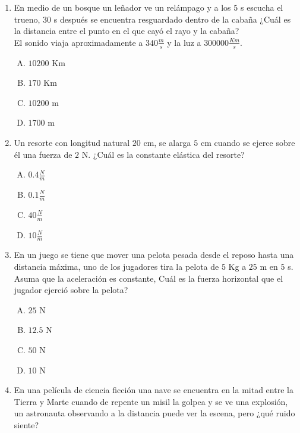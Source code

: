 \begin{enumerate}
\item En medio de un bosque un leñador ve un relámpago y a los $5$ s escucha el trueno, $30$ s después se encuentra resguardado dentro de la cabaña ¿Cuál es la distancia entre el punto en el que cayó el rayo y la cabaña?\label{dia-20}\\
El sonido viaja aproximadamente a $340\frac{m}{s}$ y la luz a $300000\frac{Km}{s}$. 

\begin{enumerate}[(A)]
\item $10200$ Km
\item $170$ Km
\item $10200$ m
\item $1700$ m
\end{enumerate}


\item Un resorte con longitud natural $20$ cm, se alarga $5$ cm cuando se ejerce sobre él una fuerza de $2$ N. ¿Cuál es la constante elástica del resorte? \label{dia-21}

\begin{enumerate}[(A)]
\item $0.4\frac{N}{m}$
\item $0.1\frac{N}{m}$
\item $40\frac{N}{m}$
\item $10\frac{N}{m}$
\end{enumerate}

\item En un juego se tiene que mover una pelota pesada desde el reposo hasta una distancia máxima, uno de los jugadores tira la pelota de $5$ Kg a $25$ m en $5$ s. Asuma que la aceleración es constante, Cuál es la fuerza horizontal que el jugador ejerció sobre la pelota? \label{dia-22}

\begin{enumerate}[(A)]
\item $25$ N
\item $12.5$ N
\item $50$ N
\item $10$ N
\end{enumerate}

\item En una película de ciencia ficción una nave se encuentra en la mitad entre la Tierra y Marte cuando de repente un misil la golpea y se ve una explosión, un astronauta observando a la distancia puede ver la escena, pero ¿qué ruido siente?\label{dia-23}


\end{enumerate}
